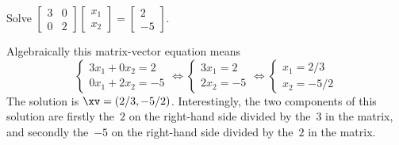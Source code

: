 \begin{reduce}
\begin{example} 
Solve 
\(\begin{bmatrix} 3&0\\0&2 \end{bmatrix}
\begin{bmatrix} x_1\\x_2 \end{bmatrix}
=\begin{bmatrix} 2\\-5 \end{bmatrix}\).
\begin{solution}
Algebraically this matrix-vector equation means
\begin{equation*}
\begin{cases} 3x_1+0x_2=2 \\ 0x_1+2x_2=-5\end{cases}
\iff
\begin{cases} 3x_1=2 \\ 2x_2=-5\end{cases}
\iff
\begin{cases} x_1=2/3 \\ x_2=-5/2\end{cases}
\end{equation*}
The solution is \(\xv=(2/3,-5/2)\).
Interestingly, the two components of this solution are firstly the~\(2\) on the right-hand side divided by the~\(3\) in the matrix, and secondly the~\(-5\) on the right-hand side divided by the~\(2\) in the matrix.
\end{solution}
\end{example}
\end{reduce}






